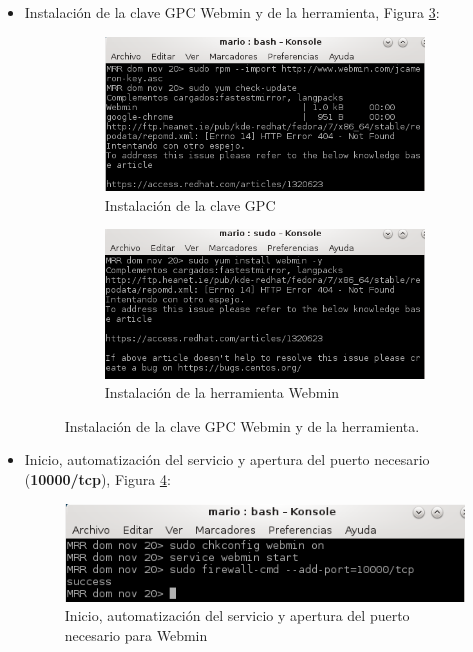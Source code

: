 \begin{itemize}
	\item Instalación de la clave GPC Webmin y de la herramienta, Figura \ref{fig:webm}:
	\begin{figure}[htbp]
		\centering
		\begin{subfigure}[H]{0.3\textwidth}		
			\includegraphics[scale=0.4]{figuras/figura40.png} 
			\caption{Instalación de la clave GPC} 
			\label{fig:figura40}
		\end{subfigure}	\hspace{20mm}
		\begin{subfigure}[H]{0.5\textwidth}
			\includegraphics[scale=0.4]{figuras/figura41.png} 
			\caption{Instalación de la herramienta Webmin} 
			\label{fig:figura41}
		\end{subfigure}
		\caption{Instalación de la clave GPC Webmin y de la herramienta.} \label{fig:webm}
	\end{figure}

	\item Inicio, automatización del servicio y apertura del puerto necesario (\textbf{10000/tcp}), Figura \ref{fig:figura42}:
	\begin{figure}[H] %
		\centering
		\includegraphics[scale=0.8]{figuras/figura42.png} 
		\caption{Inicio, automatización del servicio y apertura del puerto necesario para Webmin} 
		\label{fig:figura42}
	\end{figure}


\end{itemize}
